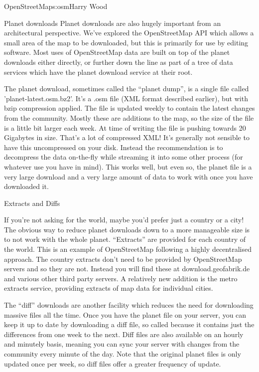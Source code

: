 \begin{aosachapter}{OpenStreetMap}{s:osm}{Harry Wood}
\begin{aosasect1}{Planet downloads}
Planet downloads are also hugely important from an architectural
perspective. We've explored the OpenStreetMap API which allows a small
area of the map to be downloaded, but this is primarily for use by
editing software. Most uses of OpenStreetMap data are built on top of
the planet downloads either directly, or further down the line as part
of a tree of data services which have the planet download service at
their root.

The planet download, sometimes called the ``planet dump'', is a single
file called 'planet-latest.osm.bz2'. It's a .osm file (XML format
described earlier), but with bzip compression applied. The file is
updated weekly to contain the latest changes from the
community. Mostly these are additions to the map, so the size of the
file is a little bit larger each week. At time of writing the file is
pushing towards 20 Gigabytes in size. That's a lot of compressed XML!
It's generally not sensible to have this uncompressed on your
disk. Instead the recommendation is to decompress the data on-the-fly
while streaming it into some other process (for whatever use you have
in mind). This works well, but even so, the planet file is a very
large download and a very large amount of data to work with once you
have downloaded it.

\begin{aosasect2}{Extracts and Diffs}

If you're not asking for the world, maybe you'd prefer just a country
or a city! The obvious way to reduce planet downloads down to a more
manageable size is to not work with the whole planet. ``Extracts'' are
provided for each country of the world. This is an example of
OpenStreetMap following a highly decentralised approach. The country
extracts don't need to be provided by OpenStreetMap servers and so
they are not. Instead you will find these at download.geofabrik.de and
various other third party servers. A relatively new addition is the
metro extracts service, providing extracts of map data for individual
cities.

The ``diff'' downloads are another facility which reduces the need for
downloading massive files all the time. Once you have the planet file
on your server, you can keep it up to date by downloading a diff file,
so called because it contains just the differences from one week to
the next. Diff files are also available on an hourly and minutely
basis, meaning you can sync your server with changes from the
community every minute of the day. Note that the original planet files
is only updated once per week, so diff files offer a greater frequency
of update.


\end{aosasect2}
\end{aosasect1}
\end{aosachapter}

